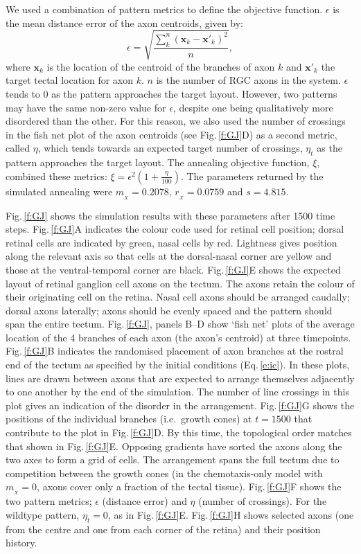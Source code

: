 \documentclass[11pt, a4paper]{article}
\begin{document}
We used a combination of pattern metrics to define the objective function. $\epsilon$ is the mean distance error of the axon centroids, given by:
%
\begin{equation}\label{e:eps}
\epsilon = \sqrt{\frac{\sum_k^n (\mathbf{x}_{k} - \mathbf{x}'_{k})^2}{n}},
\end{equation}
%
where $\mathbf{x}_{k}$ is the location of the centroid of the branches of axon $k$ and $\mathbf{x}'_{k}$ the target tectal location for axon $k$.
$n$ is the number of RGC axons in the system.
%
$\epsilon$ tends to 0 as the pattern approaches the target layout.
However, two patterns may have the same non-zero value for $\epsilon$, despite one being qualitatively more disordered than the other. 
For this reason, we also used the number of crossings in the fish net plot of the axon centroids (see Fig.\,\ref{f:GJ}D) as a second metric, called $\eta$, which tends towards an expected target number of crossings, $\eta_t$ as the pattern approaches the target layout. The annealing objective function, $\xi$, combined these metrics: $\xi = \epsilon^2 (1+\frac{\eta}{100})$.
The parameters returned by the simulated annealing were
$m_{\!_X} = 0.2078$, $r_{\!_X} = 0.0759$ and $s = 4.815$. 

Fig.\,\ref{f:GJ} shows the simulation results with these parameters after 1500 time steps. 
Fig.\,\ref{f:GJ}A indicates the colour code used for retinal cell position; dorsal retinal cells are indicated by green, nasal cells by red. Lightness gives position along the relevant axis so that cells at the dorsal-nasal corner are yellow and those at the ventral-temporal corner are black.
Fig.\,\ref{f:GJ}E shows the expected layout of retinal ganglion cell axons on the tectum.
The axons retain the colour of their originating cell on the retina.
Nasal cell axons should be arranged caudally; dorsal axons laterally; axons should be evenly spaced and the pattern should span the entire tectum.
Fig.\,\ref{f:GJ}, panels B--D show `fish net' plots of the average location of the 4 branches of each axon (the axon's centroid) at three timepoints. 
Fig.\,\ref{f:GJ}B indicates the randomised placement of axon branches at the rostral end of the tectum as specified by the initial conditions (Eq.\,\ref{e:ic}).
In these plots, lines are drawn between axons that are expected to arrange themselves adjacently to one another by the end of the simulation. 
The number of line crossings in this plot gives an indication of the disorder in the arrangement.
Fig.\,\ref{f:GJ}G shows the positions of the individual branches (i.e.~growth cones) at $t=1500$ that contribute to the plot in Fig.\,\ref{f:GJ}D.
By this time, the topological order matches that shown in Fig.\,\ref{f:GJ}E.
Opposing gradients have sorted the axons along the two axes to form a grid of cells.
The arrangement spans the full tectum due to competition between the growth cones (in the chemotaxis-only model with $m_{\!_X}=0$, axons cover only a fraction of the tectal tissue).
Fig.\,\ref{f:GJ}F shows the two pattern metrics; $\epsilon$ (distance error) and $\eta$ (number of crossings).
For the wildtype pattern, $\eta_t=0$, as in Fig.\,\ref{f:GJ}E. 
Fig.\,\ref{f:GJ}H shows selected axons (one from the centre and one from each corner of the retina) and their position history.
\end{document}
